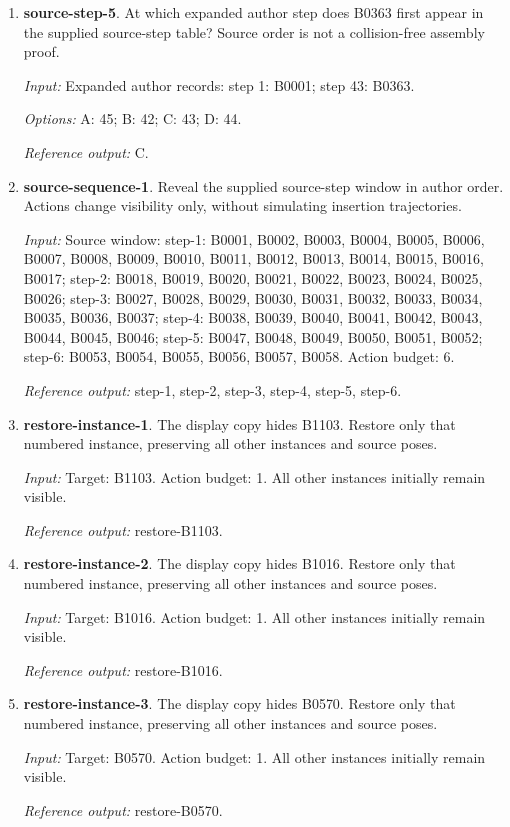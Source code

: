 \begin{enumerate}
\item \textbf{source-step-5}. At which expanded author step does B0363 first appear in the supplied source-step table? Source order is not a collision-free assembly proof.\par {\small \textit{Input:} Expanded author records: step 1: B0001; step 43: B0363. \par\textit{Options:} A: 45; B: 42; C: 43; D: 44. \par\textit{Reference output:} C.}
\item \textbf{source-sequence-1}. Reveal the supplied source-step window in author order. Actions change visibility only, without simulating insertion trajectories.\par {\small \textit{Input:} Source window: step-1: B0001, B0002, B0003, B0004, B0005, B0006, B0007, B0008, B0009, B0010, B0011, B0012, B0013, B0014, B0015, B0016, B0017; step-2: B0018, B0019, B0020, B0021, B0022, B0023, B0024, B0025, B0026; step-3: B0027, B0028, B0029, B0030, B0031, B0032, B0033, B0034, B0035, B0036, B0037; step-4: B0038, B0039, B0040, B0041, B0042, B0043, B0044, B0045, B0046; step-5: B0047, B0048, B0049, B0050, B0051, B0052; step-6: B0053, B0054, B0055, B0056, B0057, B0058. Action budget: 6. \par\textit{Reference output:} step-1, step-2, step-3, step-4, step-5, step-6.}
\item \textbf{restore-instance-1}. The display copy hides B1103. Restore only that numbered instance, preserving all other instances and source poses.\par {\small \textit{Input:} Target: B1103. Action budget: 1. All other instances initially remain visible. \par\textit{Reference output:} restore-B1103.}
\item \textbf{restore-instance-2}. The display copy hides B1016. Restore only that numbered instance, preserving all other instances and source poses.\par {\small \textit{Input:} Target: B1016. Action budget: 1. All other instances initially remain visible. \par\textit{Reference output:} restore-B1016.}
\item \textbf{restore-instance-3}. The display copy hides B0570. Restore only that numbered instance, preserving all other instances and source poses.\par {\small \textit{Input:} Target: B0570. Action budget: 1. All other instances initially remain visible. \par\textit{Reference output:} restore-B0570.}
\end{enumerate}
